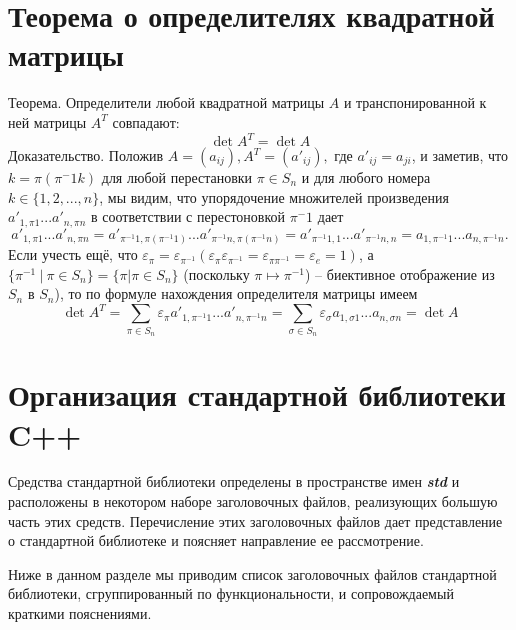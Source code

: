 \documentclass[a4paper, 12pt]{extarticle} %
\begin{document}
\section*{Теорема о определителях квадратной матрицы}
Теорема. Определители любой квадратной матрицы $A$ и транспонированной к ней матрицы $A^T$ совпадают:
\begin{equation}
    \det A^T = \det A
\end{equation}
Доказательство. Положив $A = (a_{ij}), A^T = (a'_{ij}),$ где $a'_{ij} = a_{ji}$, и заметив, что $k = \pi(\pi^-1 k)$ для любой перестановки $\pi \in S_n$ и для любого номера $k \in \{1,2,...,n\}$, мы видим, что упорядочение множителей произведения $a'_{1,\pi 1} ... a'_{n,\pi n}$ в соответствии с перестоновкой $\pi^-1$ дает
\begin{equation}
    a'_{1,\pi 1} ... a'_{n,\pi n} = a'_{\pi^{-1} 1, \pi(\pi^{-1} 1)} ... a'_{\pi^{-1} n, \pi(\pi^{-1} n)} = a'_{\pi^{-1} 1, 1} ... a'_{\pi^{-1} n, n} = a_{1, \pi^{-1} 1} ... a_{n, \pi^{-1} n}.
\end{equation}
Если учесть ещё, что $\varepsilon_\pi = \varepsilon_{\pi^{-1}} (\varepsilon_\pi \varepsilon_{\pi^{-1}} = \varepsilon_{\pi \pi^{-1}} = \varepsilon_e = 1)$, а $\{\pi^{-1} \ | \ \pi \in S_n\} = \{\pi | \pi \in S_n\}$ (поскольку $\pi \mapsto \pi^{-1}$) -- биективное отображение из $S_n$ в $S_n$), то по формуле нахождения определителя матрицы имеем
\begin{equation}
    \det A^T = \sum_{\pi \in S_n} \varepsilon_\pi a'_{1, \pi^{-1} 1} ... a'_{n, \pi^{-1} n} = \sum_{\sigma \in S_n} \varepsilon_\sigma a_{1, \sigma 1} ... a_{n, \sigma n} = \det A
\end{equation}

\clearpage
\section*{Организация стандартной библиотеки C++}
Средства стандартной библиотеки определены в пространстве имен \textbf{\textit{std}} и расположены в некотором наборе заголовочных файлов, реализующих большую часть этих средств. Перечисление этих заголовочных файлов дает представление о стандартной библиотеке и поясняет направление ее рассмотрение.

Ниже в данном разделе мы приводим список заголовочных файлов стандартной библиотеки, сгруппированный по функциональности, и сопровождаемый краткими пояснениями.
\end{document}
